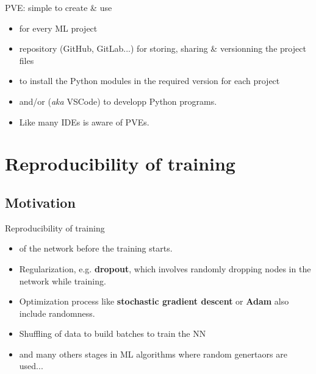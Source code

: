 \documentclass[10pt,serif,mathserif,compress,hyperref={colorlinks}]{beamer}
\begin{document}
\begin{frame}{PVE: simple to create \& use}
  
  \begin{tcolorbox}[title=the winning recipe]
    
    \begin{itemize}
    \item <1->  for every ML project
    \item <2->  repository (GitHub, GitLab...) for storing, sharing \& versionning the project files
    \item <3->  to install the Python modules in the required version for each project
    \item <4->  and/or  ({\it aka} VSCode) to developp Python programs.
    \item <5-> Like many IDEs  is aware of PVEs.
      
    \end{itemize}
    \end{tcolorbox} 
\end{frame}

\section{Reproducibility of training}

\subsection{Motivation}

\begin{frame}{Reproducibility of training}
  
  \begin{tcolorbox}[title=Where to find randomness in NN training]
    
    \begin{itemize}
    \item<1->  of the network before the training starts.
    \item<2-> Regularization, e.g. {\bf dropout}, which involves randomly dropping nodes in the network while training.
    \item<3-> Optimization process like {\bf stochastic gradient descent} or {\bf Adam} also include randomness.
    \item<4-> Shuffling of data to build batches to train the NN
    \item<5-> and many others stages in ML algorithms  where random genertaors are used...
    \end{itemize}
  \end{tcolorbox}
    
\end{frame}
 
\end{document}
